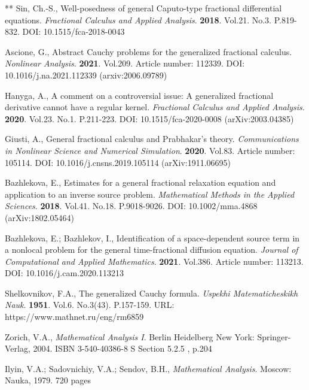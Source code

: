 \documentclass[12pt]{article}
\begin{document}
\begin{thebibliography}{**}
 Sin, Ch.-S., 
Well-posedness of general Caputo-type fractional differential equations. 
\textit{Fractional Calculus and Applied Analysis}. 
\textbf{2018}. Vol.21. No.3. P.819-832. 
DOI: 10.1515/fca-2018-0043

 Ascione, G., 
Abstract Cauchy problems for the generalized fractional calculus.
\textit{Nonlinear Analysis}. 
\textbf{2021}. Vol.209. Article number: 112339.
DOI: 10.1016/j.na.2021.112339 (arxiv:2006.09789)

 Hanyga, A., 
A comment on a controversial issue: 
A generalized fractional derivative cannot have a regular kernel. 
\textit{Fractional Calculus and Applied Analysis}. 
\textbf{2020}. Vol.23. No.1. P.211-223. 
DOI: 10.1515/fca-2020-0008 
(arXiv:2003.04385)

 Giusti, A., 
General fractional calculus and Prabhakar's theory.
\textit{Communications in Nonlinear Science and Numerical Simulation}. 
\textbf{2020}. Vol.83. Article number: 105114.
DOI: 10.1016/j.cnsns.2019.105114 
(arXiv:1911.06695)

 Bazhlekova, E., 
Estimates for a general fractional relaxation equation and application to an inverse source problem. 
\textit{Mathematical Methods in the Applied Sciences}.
\textbf{2018}. Vol.41. No.18. P.9018-9026.
DOI: 10.1002/mma.4868 
(arXiv:1802.05464)

 Bazhlekova, E.; Bazhlekov, I.,
Identification of a space-dependent source term in a nonlocal 
problem for the general time-fractional diffusion equation. 
\textit{Journal of Computational and Applied Mathematics}.
\textbf{2021}. Vol.386. Article number: 113213.
DOI: 10.1016/j.cam.2020.113213


 Shelkovnikov, F.A.,
The generalized Cauchy formula. 
\textit{Uspekhi Matematicheskikh Nauk}. 
\textbf{1951}. Vol.6. No.3(43). P.157-159. 
URL: https://www.mathnet.ru/eng/rm6859


 Zorich, V.A.,
\textit{Mathematical Analysis I}.
Berlin Heidelberg New York: Springer-Verlag, 2004. 
ISBN 3-540-40386-8 S
Section 5.2.5 \cite{Zorich}, p.204

 Ilyin, V.A.; Sadovnichiy, V.A.; Sendov, B.H.,
\textit{Mathematical Analysis}.
Moscow: Nauka, 1979. 720 pages


\end{thebibliography}
\end{document}

